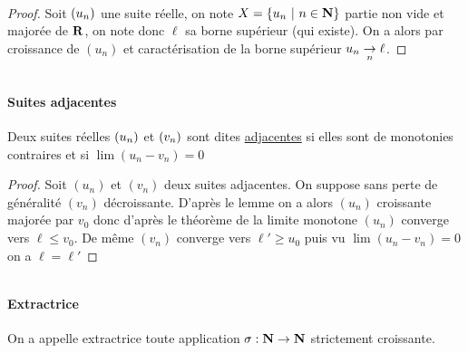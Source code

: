 		\vspace*{0.5cm} \\ 
		\begin{proof}
		Soit $(u_n)$ une suite réelle, on note $X=\{u_n ~|~n\in{\mathbf{N}}\}$ partie non vide et majorée de ${\mathbf{R}}$, on note donc $\ell$ sa borne supérieur (qui existe). On a alors par croissance de $(u_n)$ et caractérisation de la borne supérieur $u_n \underset{n}{\rightarrow} \ell$.
		\end{proof} ${}$ \traitd
		\paragraph{Suites adjacentes}
			Deux suites réelles $(u_n)$ et $(v_n)$ sont dites \uline{adjacentes} si elles sont de monotonies contraires et si $\lim (u_n-v_n)=0$\trait
		\vspace*{0.5cm} \\ 
		\begin{proof}
		Soit $(u_n)$ et $(v_n)$ deux suites adjacentes. On suppose sans perte de généralité $(v_n)$ décroissante. D'après le lemme on a alors $(u_n)$ croissante majorée par $v_0$ donc d'après le théorème de la limite monotone $(u_n)$ converge vers $\ell\leqslant v_0$. De même $(v_n) $ converge vers $\ell' \geqslant u_0$ puis vu $\lim (u_n-v_n) = 0$ on a $\ell = \ell'$
		\end{proof} ${}$ \traitd
		\paragraph{Extractrice}
			On a appelle extractrice toute application $\sigma : {\mathbf{N}}\to{\mathbf{N}}$ strictement croissante. \trait
		 \newpage \traitd
